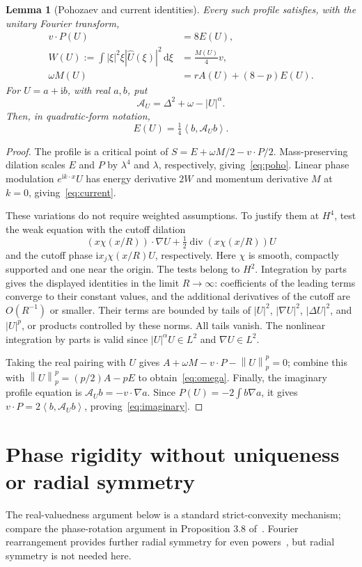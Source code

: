 \documentclass[11pt,a4paper]{article}
\newtheorem{lemma}[theorem]{Lemma}
\theoremstyle{remark}\newtheorem{remark}[theorem]{Remark}
\newcommand{\ii}{\mathrm i}\newcommand{\dd}{\,\mathrm d}
\newcommand{\norm}[1]{\left\|#1\right\|}
\newcommand{\ip}[2]{\left\langle #1,#2\right\rangle}
\begin{document}
\begin{lemma}[Pohozaev and current identities]\label{lem:identities}
Every such profile satisfies, with the unitary Fourier transform,
\begin{align}
 v\cdot P(U)&=8E(U),\label{eq:poho}\\
 W(U):=\int |\xi|^2\xi|\widehat U(\xi)|^2\dd\xi&=\frac{M(U)}4v,\label{eq:current}\\
 \omega M(U)&=rA(U)+(8-p)E(U).\label{eq:omega}
\end{align}
For $U=a+\ii b$, with real $a,b$, put
\[
 \mathcal A_U=\Delta^2+\omega-|U|^\alpha.
\]
Then, in quadratic-form notation,
\begin{equation}\label{eq:imaginary}
 \boxed{E(U)=\tfrac14\ip b{\mathcal A_Ub}.}
\end{equation}
\end{lemma}
\begin{proof}
The profile is a critical point of $S=E+\omega M/2-v\cdot P/2$. Mass-preserving dilation scales $E$ and $P$ by $\lambda^4$ and $\lambda$, respectively, giving~\eqref{eq:poho}. Linear phase modulation $e^{\ii k\cdot x}U$ has energy derivative $2W$ and momentum derivative $M$ at $k=0$, giving~\eqref{eq:current}.

These variations do not require weighted assumptions. To justify them at $H^4$, test the weak equation with the cutoff dilation
\[
 (x\chi(x/R))\cdot\nabla U+
 \tfrac12\operatorname{div}(x\chi(x/R))U
\]
and the cutoff phase $\ii x_j\chi(x/R)U$, respectively. Here $\chi$ is smooth, compactly supported and one near the origin. The tests belong to $H^2$. Integration by parts gives the displayed identities in the limit $R\to\infty$: coefficients of the leading terms converge to their constant values, and the additional derivatives of the cutoff are $O(R^{-1})$ or smaller. Their terms are bounded by tails of $|U|^2$, $|\nabla U|^2$, $|\Delta U|^2$, and $|U|^p$, or products controlled by these norms. All tails vanish. The nonlinear integration by parts is valid since $|U|^\alpha U\in L^2$ and $\nabla U\in L^2$.

Taking the real pairing with $U$ gives $A+\omega M-v\cdot P-\norm U_p^p=0$; combine this with $\norm U_p^p=(p/2)A-pE$ to obtain~\eqref{eq:omega}. Finally, the imaginary profile equation is $\mathcal A_Ub=-v\cdot\nabla a$. Since $P(U)=-2\int b\nabla a$, it gives $v\cdot P=2\ip b{\mathcal A_Ub}$, proving~\eqref{eq:imaginary}.
\end{proof}

\section{Phase rigidity without uniqueness or radial symmetry}
The real-valuedness argument below is a standard strict-convexity mechanism; compare the phase-rotation argument in Proposition 3.8 of~\cite{FJMM}. Fourier rearrangement provides further radial symmetry for even powers~\cite{LS}, but radial symmetry is not needed here.
\end{document}
